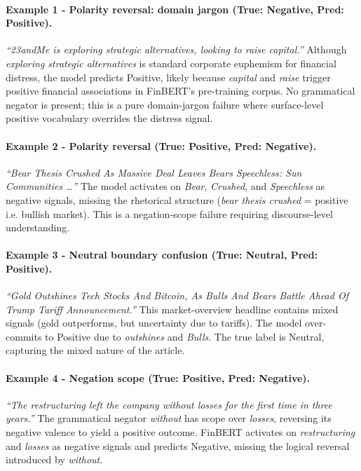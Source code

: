 \documentclass[11pt]{article}
\begin{document}
\paragraph{Example 1 - Polarity reversal: domain jargon (True: Negative, Pred: Positive).}
\textit{``23andMe is exploring strategic alternatives, looking to raise
capital.''} Although \textit{exploring strategic alternatives} is standard
corporate euphemism for financial distress, the model predicts Positive,
likely because \textit{capital} and \textit{raise} trigger positive financial
associations in FinBERT's pre-training corpus. No grammatical negator is
present; this is a pure domain-jargon failure where surface-level positive
vocabulary overrides the distress signal.

\paragraph{Example 2 - Polarity reversal (True: Positive, Pred: Negative).}
\textit{``Bear Thesis Crushed As Massive Deal Leaves Bears Speechless: Sun
Communities \ldots''} The model activates on \textit{Bear}, \textit{Crushed},
and \textit{Speechless} as negative signals, missing the rhetorical structure
(\textit{bear thesis crushed} = positive i.e. bullish market). This is a
negation-scope failure requiring discourse-level understanding.

\paragraph{Example 3 - Neutral boundary confusion (True: Neutral, Pred: Positive).}
\textit{``Gold Outshines Tech Stocks And Bitcoin, As Bulls And Bears Battle
Ahead Of Trump Tariff Announcement.''} This market-overview headline contains
mixed signals (gold outperforms, but uncertainty due to tariffs). The model
over-commits to Positive due to \textit{outshines} and \textit{Bulls}. The
true label is Neutral, capturing the mixed nature of the article.

\paragraph{Example 4 - Negation scope (True: Positive, Pred: Negative).}
\textit{``The restructuring left the company without losses for the first time
in three years.''} The grammatical negator \textit{without} has scope over
\textit{losses}, reversing its negative valence to yield a positive outcome.
FinBERT activates on \textit{restructuring} and \textit{losses} as negative
signals and predicts Negative, missing the logical reversal introduced by
\textit{without}.
\end{document}
